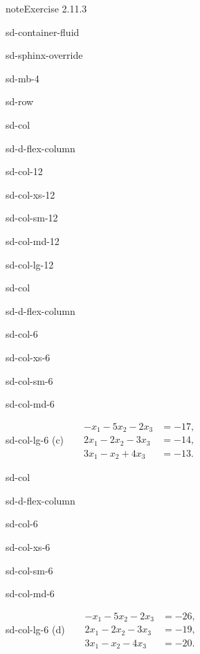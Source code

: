 \documentclass[letterpaper,10pt,english]{jupyterBook}
\begin{document}
\begin{sphinxadmonition}{note}{Exercise 2.11.3}
\begin{sphinxuseclass}{sd-container-fluid}
\begin{sphinxuseclass}{sd-sphinx-override}
\begin{sphinxuseclass}{sd-mb-4}
\begin{sphinxuseclass}{sd-row}
\begin{sphinxuseclass}{sd-col}
\begin{sphinxuseclass}{sd-d-flex-column}
\begin{sphinxuseclass}{sd-col-12}
\begin{sphinxuseclass}{sd-col-xs-12}
\begin{sphinxuseclass}{sd-col-sm-12}
\begin{sphinxuseclass}{sd-col-md-12}
\begin{sphinxuseclass}{sd-col-lg-12}
\end{sphinxuseclass}
\end{sphinxuseclass}
\end{sphinxuseclass}
\end{sphinxuseclass}
\end{sphinxuseclass}
\end{sphinxuseclass}
\end{sphinxuseclass}
\begin{sphinxuseclass}{sd-col}
\begin{sphinxuseclass}{sd-d-flex-column}
\begin{sphinxuseclass}{sd-col-6}
\begin{sphinxuseclass}{sd-col-xs-6}
\begin{sphinxuseclass}{sd-col-sm-6}
\begin{sphinxuseclass}{sd-col-md-6}
\begin{sphinxuseclass}{sd-col-lg-6}
\sphinxAtStartPar
(c)  
\( \begin{align*}
     - x_{1} - 5 x_{2} - 2 x_{3} &= -17, \\
     2 x_{1} - 2 x_{2} - 3 x_{3} &= -14, \\
     3 x_{1} -  x_{2} + 4 x_{3} &= -13.
\end{align*} \)

\end{sphinxuseclass}
\end{sphinxuseclass}
\end{sphinxuseclass}
\end{sphinxuseclass}
\end{sphinxuseclass}
\end{sphinxuseclass}
\end{sphinxuseclass}
\begin{sphinxuseclass}{sd-col}
\begin{sphinxuseclass}{sd-d-flex-column}
\begin{sphinxuseclass}{sd-col-6}
\begin{sphinxuseclass}{sd-col-xs-6}
\begin{sphinxuseclass}{sd-col-sm-6}
\begin{sphinxuseclass}{sd-col-md-6}
\begin{sphinxuseclass}{sd-col-lg-6}
\sphinxAtStartPar
(d)  
\( \begin{align*}
     - x_{1} - 5 x_{2} - 2 x_{3} &= -26, \\
     2 x_{1} - 2 x_{2} - 3 x_{3} &= -19, \\
     3 x_{1} -  x_{2} - 4 x_{3} &= -20.
\end{align*} \)


\end{sphinxuseclass}
\end{sphinxuseclass}
\end{sphinxuseclass}
\end{sphinxuseclass}
\end{sphinxuseclass}
\end{sphinxuseclass}
\end{sphinxuseclass}
\end{sphinxuseclass}
\end{sphinxuseclass}
\end{sphinxuseclass}
\end{sphinxuseclass}
\end{sphinxadmonition}
\end{document}
